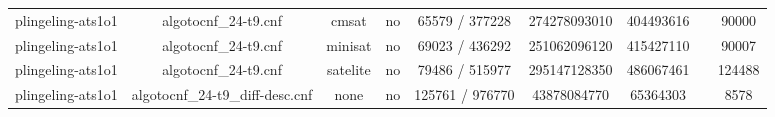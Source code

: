 \begin{appendices}
\begin{table}[p]
\begin{center}
\begin{tabular}{l|cccccccc}
  plingeling-ats1o1              & algotocnf\_24-t9.cnf           & cmsat      & no    & 65579 / 377228 & 274278093010 & 404493616 &            & 90000 \\ %
  plingeling-ats1o1              & algotocnf\_24-t9.cnf           & minisat    & no    & 69023 / 436292 & 251062096120 & 415427110 &            & 90007 \\ %
  plingeling-ats1o1              & algotocnf\_24-t9.cnf           & satelite   & no    & 79486 / 515977 & 295147128350 & 486067461 &            & 124488 \\ %
  plingeling-ats1o1              & algotocnf\_24-t9\_diff-desc.cnf & none       & no    & 125761 / 976770 & 43878084770 & 65364303  &            & 8578 \\ %
    \end{tabular}
  \end{center}
\end{table}

\newpage


\end{appendices}
